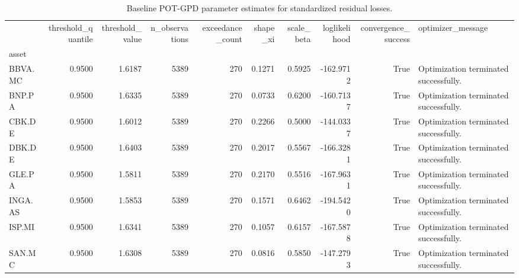\begin{table}
\caption{Baseline POT-GPD parameter estimates for standardized residual losses.}
\label{tab:evt_gpd_params_baseline}
\begin{tabular}{lrrrrrrrrl}
\toprule
 & threshold_quantile & threshold_value & n_observations & exceedance_count & shape_xi & scale_beta & loglikelihood & convergence_success & optimizer_message \\
asset &  &  &  &  &  &  &  &  &  \\
\midrule
BBVA.MC & 0.9500 & 1.6187 & 5389 & 270 & 0.1271 & 0.5925 & -162.9712 & True & Optimization terminated successfully. \\
BNP.PA & 0.9500 & 1.6335 & 5389 & 270 & 0.0733 & 0.6200 & -160.7137 & True & Optimization terminated successfully. \\
CBK.DE & 0.9500 & 1.6012 & 5389 & 270 & 0.2266 & 0.5000 & -144.0337 & True & Optimization terminated successfully. \\
DBK.DE & 0.9500 & 1.6403 & 5389 & 270 & 0.2017 & 0.5567 & -166.3281 & True & Optimization terminated successfully. \\
GLE.PA & 0.9500 & 1.5811 & 5389 & 270 & 0.2170 & 0.5516 & -167.9631 & True & Optimization terminated successfully. \\
INGA.AS & 0.9500 & 1.5853 & 5389 & 270 & 0.1571 & 0.6462 & -194.5420 & True & Optimization terminated successfully. \\
ISP.MI & 0.9500 & 1.6341 & 5389 & 270 & 0.1057 & 0.6157 & -167.5878 & True & Optimization terminated successfully. \\
SAN.MC & 0.9500 & 1.6308 & 5389 & 270 & 0.0816 & 0.5850 & -147.2793 & True & Optimization terminated successfully. \\
\bottomrule
\end{tabular}
\end{table}
